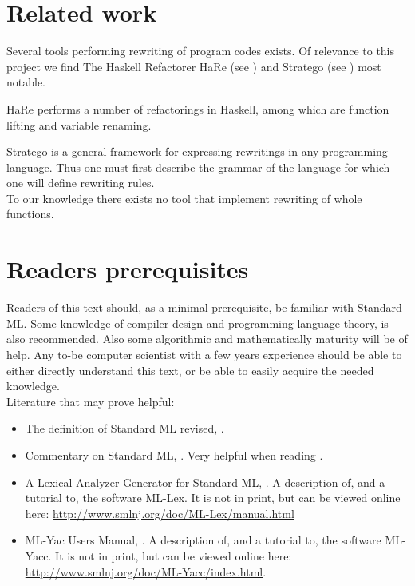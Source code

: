 
\section{Related work}
Several tools performing rewriting of program codes exists. Of relevance to this
project we find The Haskell Refactorer HaRe (see \cite{HARE}) and Stratego (see
\cite{stratego}) most notable.

HaRe performs a number of refactorings in Haskell, among which are function
lifting and variable renaming.

Stratego is a general framework for expressing rewritings in any programming
language. Thus one must first describe the grammar of the language for which one
will define rewriting rules.\\

To our knowledge there exists no tool that implement rewriting of whole
functions.

\section{Readers prerequisites}
Readers of this text should, as a minimal prerequisite, be familiar with
Standard ML. Some knowledge of compiler design and programming language theory,
is also recommended. Also some algorithmic and mathematically maturity will be
of help. Any to-be computer scientist with a few years experience should be able
to either directly understand this text, or be able to easily acquire the needed
knowledge.\\

\noindent
Literature that may prove helpful:

\begin{itemize}
\item The definition of Standard ML revised, \cite{SML97}.
\item Commentary on Standard ML, \cite{SMLCOMM}. Very helpful when reading
  \cite{SML97}.
\item A Lexical Analyzer Generator for Standard ML, \cite{MLLEX}. A description
  of, and a tutorial to, the software ML-Lex. It is not in print, but can be
  viewed online here: \url{http://www.smlnj.org/doc/ML-Lex/manual.html}
\item ML-Yac Users Manual, \cite{MLYACC}. A description of, and a tutorial to,
  the software ML-Yacc. It is not in print, but can be viewed online here:\\
  \mbox{\url{http://www.smlnj.org/doc/ML-Yacc/index.html}}.
\end{itemize}

